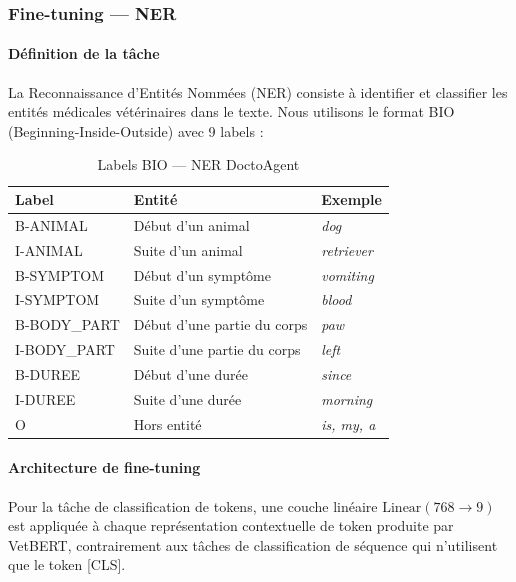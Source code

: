 \subsubsection{Fine-tuning — NER}

\paragraph{Définition de la tâche}

La Reconnaissance d'Entités Nommées (NER) consiste à identifier et classifier les entités médicales vétérinaires dans le texte. Nous utilisons le format BIO (Beginning-Inside-Outside) avec 9 labels :

\begin{table}[H]
\centering
\caption{Labels BIO — NER DoctoAgent}
\label{tab:ner-labels}
\renewcommand{\arraystretch}{1.4}
\begin{tabular}{|l|l|l|}
\hline
\textbf{Label} & \textbf{Entité} & \textbf{Exemple} \\
\hline
B-ANIMAL     & Début d'un animal           & \textit{dog} \\
I-ANIMAL     & Suite d'un animal           & \textit{retriever} \\
B-SYMPTOM    & Début d'un symptôme         & \textit{vomiting} \\
I-SYMPTOM    & Suite d'un symptôme         & \textit{blood} \\
B-BODY\_PART & Début d'une partie du corps & \textit{paw} \\
I-BODY\_PART & Suite d'une partie du corps & \textit{left} \\
B-DUREE      & Début d'une durée           & \textit{since} \\
I-DUREE      & Suite d'une durée           & \textit{morning} \\
O            & Hors entité                 & \textit{is, my, a} \\
\hline
\end{tabular}
\end{table}

\paragraph{Architecture de fine-tuning}

Pour la tâche de classification de tokens, une couche linéaire $\text{Linear}(768 \rightarrow 9)$ est appliquée à chaque représentation contextuelle de token produite par VetBERT, contrairement aux tâches de classification de séquence qui n'utilisent que le token [CLS].

